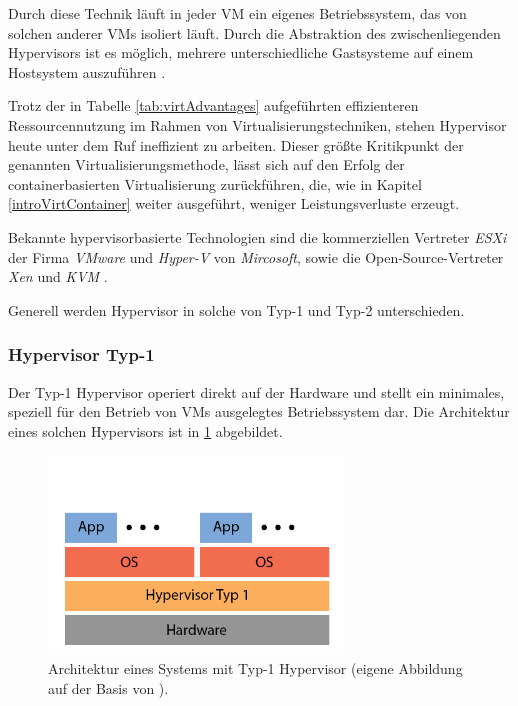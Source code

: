 \documentclass[../main.tex]{subfiles}
\begin{document}
      Durch diese Technik läuft in jeder \acrshort{VM} ein eigenes Betriebssystem, das von solchen anderer \acrshort{VM}s isoliert läuft. Durch die Abstraktion des zwischenliegenden Hypervisors ist es möglich, mehrere unterschiedliche Gastsysteme auf einem Hostsystem auszuführen \cite[S.2]{containerVirtPerformance}\cite[S.106]{tanenbaumOS}.

			Trotz der in Tabelle \ref{tab:virtAdvantages} aufgeführten effizienteren Ressourcennutzung im Rahmen von Virtualisierungstechniken, stehen Hypervisor heute unter dem Ruf ineffizient zu arbeiten. Dieser größte Kritikpunkt der genannten Virtualisierungsmethode, lässt sich auf den Erfolg der containerbasierten Virtualisierung zurückführen, die, wie in Kapitel \ref{introVirtContainer} weiter ausgeführt, weniger Leistungsverluste erzeugt.

			Bekannte hypervisorbasierte Technologien sind die kommerziellen Vertreter \emph{ESXi} der Firma \emph{VMware} und \emph{Hyper-V} von \emph{Mircosoft}, sowie die Open-Source-Vertreter \emph{Xen} und \emph{KVM} \cite[S.1]{dockerLXCKub}.

      Generell werden Hypervisor in solche von Typ-1 und Typ-2 unterschieden.




			\subsubsection{Hypervisor Typ-1}
				Der Typ-1 Hypervisor operiert direkt auf der Hardware und stellt ein minimales, speziell für den Betrieb von VMs ausgelegtes Betriebssystem dar. Die Architektur eines solchen Hypervisors ist in \fig \ref{fig:intro_hypervisor1} abgebildet.

				\begin{figure}[h]
	          \centering
	          \includegraphics[width=0.7\textwidth]{./images/intro_hypervisor1.png}
	          \caption{Architektur eines Systems mit Typ-1 Hypervisor (eigene Abbildung auf der Basis von \cite[S.107]{tanenbaumOS}).}
	          \label{fig:intro_hypervisor1}
	      \end{figure}
\end{document}
